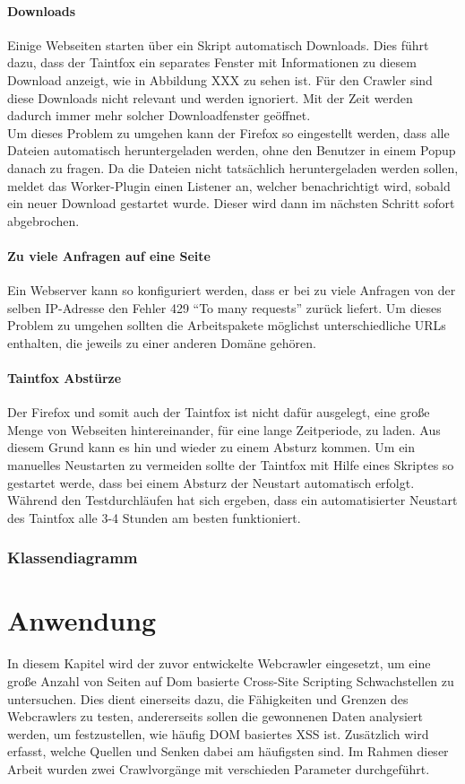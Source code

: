 \subsubsection{Downloads}
Einige Webseiten starten über ein Skript automatisch Downloads. Dies führt dazu, dass der Taintfox ein separates Fenster mit Informationen zu diesem Download anzeigt, wie in Abbildung XXX zu sehen ist. Für den Crawler sind diese Downloads nicht relevant und werden ignoriert. Mit der Zeit werden dadurch immer mehr solcher Downloadfenster geöffnet. \\
Um dieses Problem zu umgehen kann der Firefox so eingestellt werden, dass alle Dateien automatisch heruntergeladen werden, ohne den Benutzer in einem Popup danach zu fragen. Da die Dateien nicht tatsächlich heruntergeladen werden sollen, meldet das Worker-Plugin einen Listener an, welcher benachrichtigt wird, sobald ein neuer Download gestartet wurde. Dieser wird dann im nächsten Schritt sofort abgebrochen.
\subsubsection{Zu viele Anfragen auf eine Seite}
Ein Webserver kann so konfiguriert werden, dass er bei zu viele Anfragen von der selben IP-Adresse den Fehler 429 \enquote{To many requests} zurück liefert. Um dieses Problem zu umgehen sollten die Arbeitspakete möglichst unterschiedliche URLs enthalten, die jeweils zu einer anderen Domäne gehören.
\subsubsection{Taintfox Abstürze}
Der Firefox und somit auch der Taintfox ist nicht dafür ausgelegt, eine große Menge von Webseiten hintereinander, für eine lange Zeitperiode, zu laden. Aus diesem Grund kann es hin und wieder zu einem Absturz kommen. Um ein manuelles Neustarten zu vermeiden sollte der Taintfox mit Hilfe eines Skriptes so gestartet werde, dass bei einem Absturz der Neustart automatisch erfolgt. Während den Testdurchläufen hat sich ergeben, dass ein automatisierter Neustart des Taintfox alle 3-4 Stunden am besten funktioniert.
\subsection{Klassendiagramm}

\chapter{Anwendung}
In diesem Kapitel wird der zuvor entwickelte Webcrawler eingesetzt, um eine große Anzahl von Seiten auf Dom basierte Cross-Site Scripting Schwachstellen zu untersuchen. Dies dient einerseits dazu, die Fähigkeiten und Grenzen des Webcrawlers zu testen, andererseits sollen die gewonnenen Daten analysiert werden, um festzustellen, wie häufig DOM basiertes XSS ist. Zusätzlich wird erfasst, welche Quellen und Senken dabei am häufigsten sind. Im Rahmen dieser Arbeit wurden zwei Crawlvorgänge mit verschieden Parameter durchgeführt.
